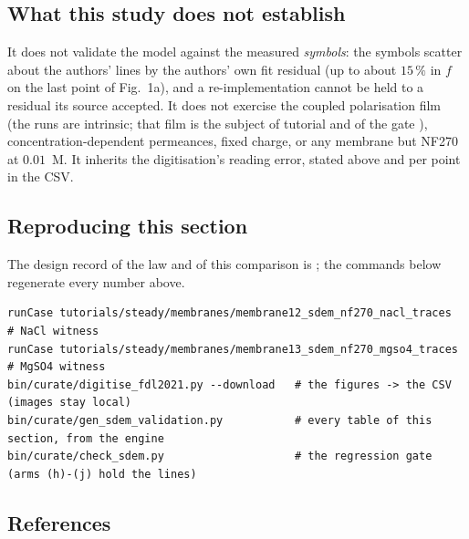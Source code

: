 \subsection*{What this study does not establish}

It does not validate the model against the measured \emph{symbols}: the
symbols scatter about the authors' lines by the authors' own fit residual
(up to about $15\,\%$ in $f$ on the last point of Fig.~1a), and a
re-implementation cannot be held to a residual its source accepted.  It
does not exercise the coupled polarisation film (the runs are intrinsic;
that film is the subject of tutorial  and of the gate
), concentration-dependent
permeances, fixed charge, or any membrane but NF270 at $0.01$~M.  It
inherits the digitisation's reading error, stated above and per point in
the CSV.

\subsection*{Reproducing this section}

The design record of the law and of this comparison is
; the
commands below regenerate every number above.

\begin{lstlisting}
runCase tutorials/steady/membranes/membrane12_sdem_nf270_nacl_traces   # NaCl witness
runCase tutorials/steady/membranes/membrane13_sdem_nf270_mgso4_traces  # MgSO4 witness
bin/curate/digitise_fdl2021.py --download   # the figures -> the CSV (images stay local)
bin/curate/gen_sdem_validation.py           # every table of this section, from the engine
bin/curate/check_sdem.py                    # the regression gate (arms (h)-(j) hold the lines)
\end{lstlisting}

\subsection*{References}

